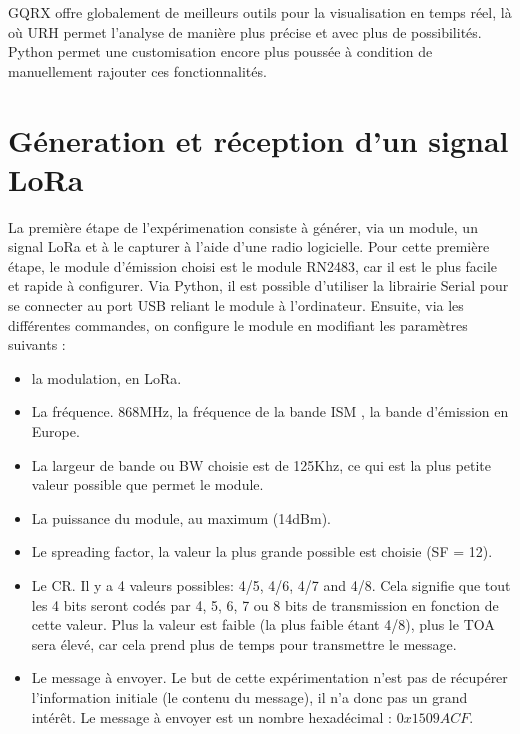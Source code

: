 GQRX offre globalement de meilleurs outils pour la visualisation en temps réel, là où \ac{URH} permet l'analyse de manière plus précise et avec plus de possibilités. Python permet une customisation encore plus poussée à condition de manuellement rajouter ces fonctionnalités.

\newpage

\section{Géneration et réception d'un signal LoRa} \label{signallora}

La première étape de l'expérimenation consiste à générer, via un module, un signal \ac{LoRa} et à le capturer à l'aide d'une radio logicielle. Pour cette première étape, le module d'émission choisi est le module RN2483, car il est le plus facile et rapide à configurer.
Via Python, il est possible d'utiliser la librairie Serial pour se connecter au port \ac{USB} reliant le module à l'ordinateur. Ensuite, via les différentes commandes, on configure le module en modifiant les paramètres suivants : 

\vspace{0.1cm}

\begin{itemize}
\item la modulation, en LoRa.
\item La fréquence. 868MHz, la fréquence de la bande \ac{ISM} , la bande d'émission en Europe.
\item La largeur de bande ou \ac{BW} choisie est de 125Khz, ce qui est la plus petite valeur possible que permet le module.
\item La puissance du module, au maximum (14dBm).
\item Le spreading factor, la valeur la plus grande possible est choisie (SF = 12).
\item Le \ac{CR}. Il y a 4 valeurs possibles: 4/5, 4/6, 4/7 and 4/8. Cela signifie que tout les 4 bits seront codés par 4, 5, 6, 7 ou 8 bits de transmission en fonction de cette valeur. Plus la valeur est faible (la plus faible étant 4/8), plus le \ac{TOA} sera élevé, car cela prend plus de temps pour transmettre le message.
\item Le message à envoyer. Le but de cette expérimentation n'est pas de récupérer l'information initiale (le contenu du message), il n'a donc pas un grand intérêt. Le message à envoyer est un nombre hexadécimal : $0x1509ACF$.
\end{itemize}

